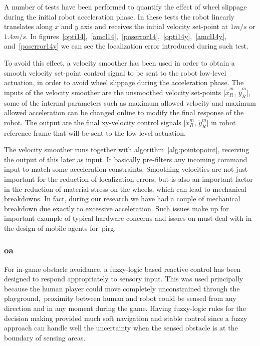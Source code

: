 A number of tests have been performed to quantify the effect of wheel slippage during the initial robot acceleration phase. In these tests the robot linearly translates along $x$ and $y$ axis and receives the initial velocity set-point at $1m/s$ or $1.4m/s$. In figures~\ref{opti14},~\ref{amcl14},~\ref{poserror14},~\ref{opti14y},~\ref{amcl14y}, and~\ref{poserror14y} we can see the localization error introduced during such test.

To avoid this effect, a velocity smoother has been used in order to obtain a smooth velocity set-point control signal to be sent to the robot low-level actuation, in order to avoid wheel slippage during the acceleration phase. The inputs of the velocity smoother are the unsmoothed velocity set-points [$\dot{\bar{x}}_R^m$, $\dot{\bar{y}}_R^m$], some of the internal parameters such as maximum allowed velocity and maximum allowed acceleration can be changed online to modify the final response of the robot. The output are the final xy-velocity control signals [$\dot{x}_R^m$, $\dot{y}_R^m$] in robot reference frame that will be sent to the low level actuation.

The velocity smoother runs together with algorithm~\ref{alg:pointopoint}, receiving the output of this later as input. It basically pre-filters any incoming command input to match some acceleration constraints. Smoothing velocities are not just important for the reduction of localization errors, but is also an important factor in the reduction of material stress on the wheels, which can lead to mechanical breakdowns. In fact, during our research we have had a couple of mechanical breakdown due exactly to excessive acceleration. Such issues make up for important example of typical hardware concerns and issues on must deal with in the design of mobile agents for~\gls{pirg}.

\subsubsection{\glsdesc{oa}}\label{sec:obt_avoidance}
For in-game obstacle avoidance, a fuzzy-logic based reactive control has been designed to respond appropriately to sensory input. This was used principally because the human player could move completely unconstrained through the playground,~\ie proximity between human and robot could be sensed from any direction and in any moment during the game. Having fuzzy-logic rules for the decision making provided much soft navigation and stable control since a fuzzy approach can handle well the uncertainty when the sensed obstacle is at the boundary of sensing areas.

